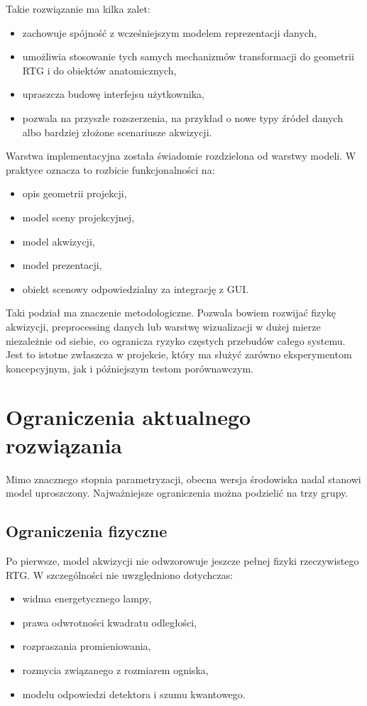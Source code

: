 \documentclass[11pt,a4paper]{article}
\begin{document}
Takie rozwiązanie ma kilka zalet:
\begin{itemize}
\item zachowuje spójność z wcześniejszym modelem reprezentacji danych,
\item umożliwia stosowanie tych samych mechanizmów transformacji do geometrii RTG
      i do obiektów anatomicznych,
\item upraszcza budowę interfejsu użytkownika,
\item pozwala na przyszłe rozszerzenia, na przykład o nowe typy źródeł danych
      albo bardziej złożone scenariusze akwizycji.
\end{itemize}

Warstwa implementacyjna została świadomie rozdzielona od warstwy modeli.
W praktyce oznacza to rozbicie funkcjonalności na:
\begin{itemize}
\item opis geometrii projekcji,
\item model sceny projekcyjnej,
\item model akwizycji,
\item model prezentacji,
\item obiekt scenowy odpowiedzialny za integrację z GUI.
\end{itemize}

Taki podział ma znaczenie metodologiczne. Pozwala bowiem rozwijać fizykę akwizycji,
preprocessing danych lub warstwę wizualizacji w dużej mierze niezależnie od siebie,
co ogranicza ryzyko częstych przebudów całego systemu. Jest to istotne zwłaszcza
w projekcie, który ma służyć zarówno eksperymentom koncepcyjnym, jak i późniejszym
testom porównawczym.

\section{Ograniczenia aktualnego rozwiązania}

Mimo znacznego stopnia parametryzacji, obecna wersja środowiska nadal stanowi model
uproszczony. Najważniejsze ograniczenia można podzielić na trzy grupy.

\subsection{Ograniczenia fizyczne}

Po pierwsze, model akwizycji nie odwzorowuje jeszcze pełnej fizyki rzeczywistego RTG.
W szczególności nie uwzględniono dotychczas:
\begin{itemize}
\item widma energetycznego lampy,
\item prawa odwrotności kwadratu odległości,
\item rozpraszania promieniowania,
\item rozmycia związanego z rozmiarem ogniska,
\item modelu odpowiedzi detektora i szumu kwantowego.
\end{itemize}
\end{document}
